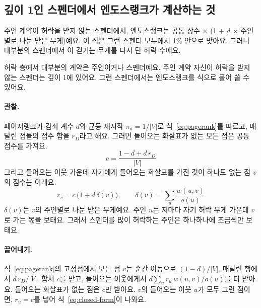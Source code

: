 \subsection{깊이 1인 스펜더에서 엔도스랭크가 계산하는 것}
\label{sec:closed}

\begin{yoji}
주인 계약이 허락을 받지 않는 스펜더에서, 엔도스랭크는 공통 상수 × (1 + $d$ × 주인별로 나눈 받은 무게)예요. 이 식은 그런 스펜더 모두에서 1\% 안으로 맞아요. 그러니 대부분의 스펜더에서 이 걷기는 무게를 다시 단 허락 수예요.
\end{yoji}

허락 층에서 대부분의 계약은 주인이거나 스펜더예요. 주인 계약 자신이 허락을 받지 않는 스펜더는 깊이 1에 있어요. 그런 스펜더에서는 엔도스랭크를 식으로 풀어 쓸 수 있어요.

\paragraph{관찰.}
페이지랭크가 감쇠 계수 $d$와 균등 재시작 $\pi_u=1/|V|$로 식~\eqref{eq:pagerank}를 따르고, 매달린 점들의 점수 합을 $r_D$라고 해요. 그러면 들어오는 화살표가 없는 모든 점은 공통 점수를 가져요.
\begin{equation}
\label{eq:c}
c=\frac{1-d+d\,r_D}{|V|}
\end{equation}
그리고 들어오는 이웃 가운데 자기에게 들어오는 화살표를 가진 것이 하나도 없는 점 $v$의 점수는 이래요.
\begin{equation}
\label{eq:closed-form}
r_v=c\,\bigl(1+d\,\delta(v)\bigr),
\qquad
\delta(v)=\sum_{u}\frac{w(u,v)}{o(u)}
\end{equation}
$\delta(v)$는 $v$의 주인별로 나눈 받은 무게예요. 주인 $u$는 저마다 자기 허락 무게 가운데 $v$로 가는 몫을 보태요. 그래서 스펜더를 많이 허락하는 주인은 하나하나에 조금씩만 보태요.

\paragraph{끌어내기.}
식~\eqref{eq:pagerank}의 고정점에서 모든 점 $v$는 순간 이동으로 $(1-d)/|V|$, 매달린 행에서 $d\,r_D/|V|$, 합쳐 $c$를 받고, 들어오는 이웃에게서 $d\sum_u r_u\,w(u,v)/o(u)$를 더 받아요. 들어오는 화살표가 없는 점은 $c$만 받아요. $v$의 들어오는 이웃 $u$가 모두 그런 점이면, $r_u=c$를 넣어 식~\eqref{eq:closed-form}이 나와요.

